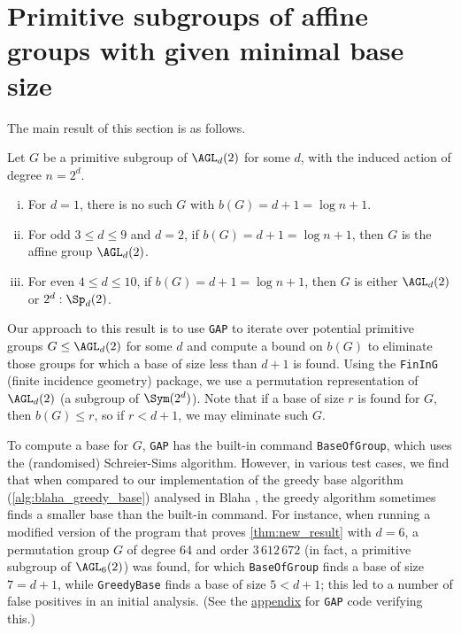 \section{Primitive subgroups of affine groups with given minimal base size}

The main result of this section is as follows.

\begin{theorem}\label{thm:new_result}
    Let $G$ be a primitive subgroup of $\AGL_d(2)$ for some $d$, with the induced action of degree $n = 2^d$.
    \begin{enumerate}[(i)]
        \item For $d = 1$, there is no such $G$ with $b(G) = d + 1 = \log n + 1$.
        \item For odd $3 \leq d \leq 9$ and $d = 2$, if $b(G) = d + 1 = \log n + 1$, then $G$ is the affine group $\AGL_d(2)$.
        \item For even $4 \leq d \leq 10$, if $b(G) = d + 1 = \log n + 1$, then $G$ is either $\AGL_d(2)$ or $2^d : \Sp_d(2)$.
    \end{enumerate}
\end{theorem}

Our approach to this result is to use \texttt{GAP} to iterate over potential primitive groups $G \leq \AGL_d(2)$ for some $d$ and compute a bound on $b(G)$ to eliminate those groups for which a base of size less than $d + 1$ is found. Using the \texttt{FinInG} (finite incidence geometry) package, we use a permutation representation of $\AGL_d(2)$ (a subgroup of $\Sym(2^d)$). Note that if a base of size $r$ is found for $G$, then $b(G) \leq r$, so if $r < d + 1$, we may eliminate such $G$.

To compute a base for $G$, \texttt{GAP} has the built-in command \texttt{BaseOfGroup}, which uses the (randomised) Schreier-Sims algorithm. However, in various test cases, we find that when compared to our implementation of the greedy base algorithm (\autoref{alg:blaha_greedy_base}) analysed in Blaha \cite{blaha1992}, the greedy algorithm sometimes finds a smaller base than the built-in command. For instance, when running a modified version of the program that proves \autoref{thm:new_result} with $d = 6$, a permutation group $G$ of degree 64 and order $3\,612\,672$ (in fact, a primitive subgroup of $\AGL_6(2)$) was found, for which \texttt{BaseOfGroup} finds a base of size $7 = d + 1$, while \texttt{GreedyBase} finds a base of size $5 < d + 1$; this led to a number of false positives in an initial analysis. (See the \hyperref[app:greedy_better_than_default]{appendix} for \texttt{GAP} code verifying this.)

